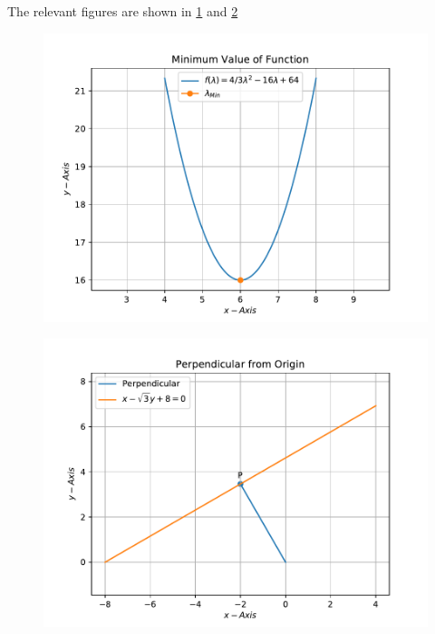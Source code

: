 \documentclass[12pt]{article}
\newcommand{\myvec}[1]{\ensuremath{\begin{pmatrix}#1\end{pmatrix}}}
\let\vec\mathbf
\begin{document}
The relevant figures are shown in \ref{fig:11/10/3/3/1/conv/Fig1} and \ref{fig:11/10/3/3/1/conv/Fig2}
\begin{figure}[!h]
	\begin{center}
		\includegraphics[width=\columnwidth]{11/10/3/3/1/conv/figs/problem3.1a.pdf}
	\end{center}
\caption{}
\label{fig:11/10/3/3/1/conv/Fig1}
\end{figure}
\begin{figure}[!h]
	\begin{center}
		\includegraphics[width=\columnwidth]{11/10/3/3/1/conv/figs/problem3.1b.pdf}
	\end{center}
\caption{}
\label{fig:11/10/3/3/1/conv/Fig2}
\end{figure}
\end{document}
